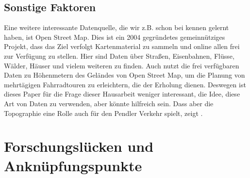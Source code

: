 \documentclass[a4paper,12pt]{thesis}
\begin{document}
\subsection{Sonstige Faktoren}

Eine weitere interessante Datenquelle, die wir z.B. schon bei \cite{Alattar2021} kennen gelernt haben, ist Open Street Map. Dies ist ein 2004 gegründetes gemeinnütziges Projekt, dass das Ziel verfolgt Kartenmaterial zu sammeln und online allen frei zur Verfügung zu stellen. Hier sind Daten über Straßen, Eisenbahnen, Flüsse, Wälder, Häuser und vielem weiteren zu finden. Auch \cite{Carl2015} nutzt die frei verfügbaren Daten zu Höhenmetern des Geländes von Open Street Map, um die Planung von mehrtägigen Fahrradtouren zu erleichtern, die der Erholung dienen. Deswegen ist dieses Paper für die Frage dieser Hausarbeit weniger interessant, die Idee, diese Art von Daten zu verwenden, aber könnte hilfreich sein. Dass aber die Topographie eine Rolle auch für den Pendler Verkehr spielt, zeigt \cite{Rietveld2004}.

\section{Forschungslücken und Anknüpfungspunkte}
\end{document}
